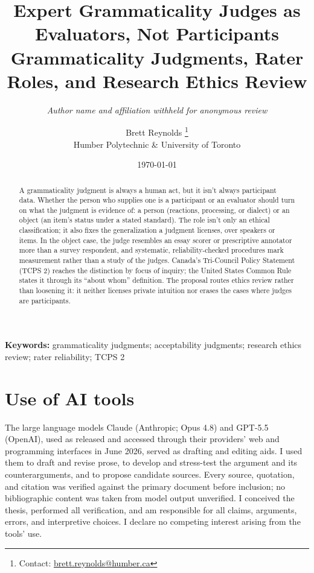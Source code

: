 \documentclass[12pt]{article}
\title{Expert Grammaticality Judges as Evaluators, Not Participants\\
{\large Grammaticality Judgments, Rater Roles, and Research Ethics Review}}
\author{\textit{Author name and affiliation withheld for anonymous review}}
\date{}
\author{Brett Reynolds \orcidlink{0000-0003-0073-7195}%
  \thanks{Contact: \href{mailto:brett.reynolds@humber.ca}{brett.reynolds@humber.ca}}\\
  Humber Polytechnic \& University of Toronto}
\date{\today}
\begin{document}
\maketitle

\begin{abstract}
A grammaticality judgment is always a human act, but it isn't always participant data. Whether the person who supplies one is a participant or an evaluator should turn on what the judgment is evidence of: a person (reactions, processing, or dialect) or an object (an item's status under a stated standard). The role isn't only an ethical classification; it also fixes the generalization a judgment licenses, over speakers or items. In the object case, the judge resembles an essay scorer or prescriptive annotator more than a survey respondent, and systematic, reliability-checked procedures mark measurement rather than a study of the judges. Canada's Tri-Council Policy Statement (TCPS 2) reaches the distinction by focus of inquiry; the United States Common Rule states it through its \enquote{about whom} definition. The proposal routes ethics review rather than loosening it: it neither licenses private intuition nor erases the cases where judges are participants.
\end{abstract}

\noindent\textbf{Keywords:} grammaticality judgments; acceptability judgments; research ethics review; rater reliability; TCPS 2










\section*{Use of AI tools}

The large language models Claude (Anthropic; Opus 4.8) and GPT-5.5 (OpenAI), used as released and accessed through their providers' web and programming interfaces in June 2026, served as drafting and editing aids. I used them to draft and revise prose, to develop and stress-test the argument and its counterarguments, and to propose candidate sources. Every source, quotation, and citation was verified against the primary document before inclusion; no bibliographic content was taken from model output unverified. I conceived the thesis, performed all verification, and am responsible for all claims, arguments, errors, and interpretive choices. I declare no competing interest arising from the tools' use.

\clearpage
\printbibliography
\end{document}
